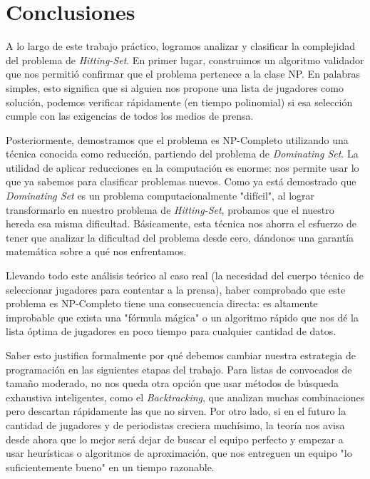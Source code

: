 \section{Conclusiones}

A lo largo de este trabajo práctico, logramos analizar y clasificar la complejidad del problema de \textit{Hitting-Set}. En primer lugar, construimos un algoritmo validador que nos permitió confirmar que el problema pertenece a la clase NP. En palabras simples, esto significa que si alguien nos propone una lista de jugadores como solución, podemos verificar rápidamente (en tiempo polinomial) si esa selección cumple con las exigencias de todos los medios de prensa.

Posteriormente, demostramos que el problema es NP-Completo utilizando una técnica conocida como reducción, partiendo del problema de \textit{Dominating Set}. La utilidad de aplicar reducciones en la computación es enorme: nos permite usar lo que ya sabemos para clasificar problemas nuevos. Como ya está demostrado que \textit{Dominating Set} es un problema computacionalmente "difícil", al lograr transformarlo en nuestro problema de \textit{Hitting-Set}, probamos que el nuestro hereda esa misma dificultad. Básicamente, esta técnica nos ahorra el esfuerzo de tener que analizar la dificultad del problema desde cero, dándonos una garantía matemática sobre a qué nos enfrentamos.

Llevando todo este análisis teórico al caso real (la necesidad del cuerpo técnico de seleccionar jugadores para contentar a la prensa), haber comprobado que este problema es NP-Completo tiene una consecuencia directa: es altamente improbable que exista una "fórmula mágica" o un algoritmo rápido que nos dé la lista óptima de jugadores en poco tiempo para cualquier cantidad de datos.

Saber esto justifica formalmente por qué debemos cambiar nuestra estrategia de programación en las siguientes etapas del trabajo. Para listas de convocados de tamaño moderado, no nos queda otra opción que usar métodos de búsqueda exhaustiva inteligentes, como el \textit{Backtracking}, que analizan muchas combinaciones pero descartan rápidamente las que no sirven. Por otro lado, si en el futuro la cantidad de jugadores y de periodistas creciera muchísimo, la teoría nos avisa desde ahora que lo mejor será dejar de buscar el equipo perfecto y empezar a usar heurísticas o algoritmos de aproximación, que nos entreguen un equipo "lo suficientemente bueno" en un tiempo razonable.
